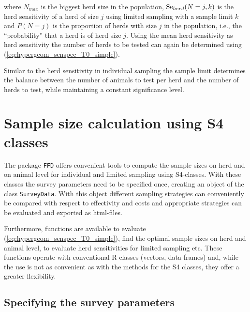 \documentclass[nojss]{jss}
\begin{document}
where $N_{max}$ is the biggest herd size in the population, 
$\mbox{Se}_{herd}(N=j,k)$ is the herd sensitivity of a herd of size $j$ 
using limited sampling with a sample limit $k$ and $P(N=j)$ is the 
proportion of herds with size $j$ in the population, i.e., the 
``probability'' that a herd is of herd size $j$. Using the mean herd 
sensitivity as herd sensitivity the number of herds to be tested can 
again be determined using (\ref{eq:hypergeom_senspec_T0_simple}). 

Similar to the herd sensitivity in individual sampling the sample 
limit determines the balance between the number of animals to test 
per herd and the number of herds to test, while maintaining a 
constant significance level.  

%
%

\section{Sample size calculation using S4 classes}
\label{sec:using-ffd-S4}

The package \texttt{FFD} offers convenient tools to compute the 
sample sizes on herd and on animal level for individual and limited 
sampling using S4-classes. With these classes the survey parameters 
need to be specified once, creating an object of the class 
\texttt{SurveyData}. With this object different sampling strategies 
can conveniently be compared with respect to effectivity and costs 
and appropriate strategies can be evaluated and exported as 
html-files.

Furthermore, functions are available to evaluate 
(\ref{eq:hypergeom_senspec_T0_simple}), find the optimal sample 
sizes on herd and animal level, to evaluate herd sensitivities for 
limited sampling etc. These functions operate with conventional 
R-classes (vectors, data frames) and, while the use is not as 
convenient as with the methods for the S4 classes, they offer a 
greater flexibility. 


\subsection{Specifying the survey parameters}
\label{subsec:surveyData} 
\end{document}
